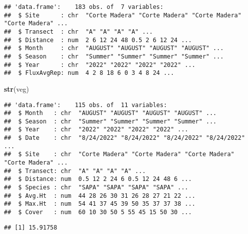 \documentclass[
]{article}
\newenvironment{Shaded}{\begin{snugshade}}{\end{snugshade}}
\newcommand{\AttributeTok}[1]{\textcolor[rgb]{0.13,0.29,0.53}{#1}}
\newcommand{\ConstantTok}[1]{\textcolor[rgb]{0.56,0.35,0.01}{#1}}
\newcommand{\FunctionTok}[1]{\textcolor[rgb]{0.13,0.29,0.53}{\textbf{#1}}}
\newcommand{\NormalTok}[1]{#1}
\newcommand{\OtherTok}[1]{\textcolor[rgb]{0.56,0.35,0.01}{#1}}
\newcommand{\SpecialCharTok}[1]{\textcolor[rgb]{0.81,0.36,0.00}{\textbf{#1}}}
\begin{document}
\begin{verbatim}
## 'data.frame':    183 obs. of  7 variables:
##  $ Site      : chr  "Corte Madera" "Corte Madera" "Corte Madera" "Corte Madera" ...
##  $ Transect  : chr  "A" "A" "A" "A" ...
##  $ Distance  : num  2 6 12 24 48 0.5 2 6 12 24 ...
##  $ Month     : chr  "AUGUST" "AUGUST" "AUGUST" "AUGUST" ...
##  $ Season    : chr  "Summer" "Summer" "Summer" "Summer" ...
##  $ Year      : chr  "2022" "2022" "2022" "2022" ...
##  $ FluxAvgRep: num  4 2 8 18 6 0 3 4 8 24 ...
\end{verbatim}

\begin{Shaded}
\begin{Highlighting}[]
\FunctionTok{str}\NormalTok{(veg)}
\end{Highlighting}
\end{Shaded}

\begin{verbatim}
## 'data.frame':    115 obs. of  11 variables:
##  $ Month   : chr  "AUGUST" "AUGUST" "AUGUST" "AUGUST" ...
##  $ Season  : chr  "Summer" "Summer" "Summer" "Summer" ...
##  $ Year    : chr  "2022" "2022" "2022" "2022" ...
##  $ Date    : chr  "8/24/2022" "8/24/2022" "8/24/2022" "8/24/2022" ...
##  $ Site    : chr  "Corte Madera" "Corte Madera" "Corte Madera" "Corte Madera" ...
##  $ Transect: chr  "A" "A" "A" "A" ...
##  $ Distance: num  0.5 12 2 24 6 0.5 12 24 48 6 ...
##  $ Species : chr  "SAPA" "SAPA" "SAPA" "SAPA" ...
##  $ Avg.Ht  : num  44 28 26 30 31 26 28 27 21 22 ...
##  $ Max.Ht  : num  54 41 37 45 39 50 35 37 37 38 ...
##  $ Cover   : num  60 10 30 50 5 55 45 15 50 30 ...
\end{verbatim}

\begin{Shaded}
\end{Shaded}

\begin{verbatim}
## [1] 15.91758
\end{verbatim}

\begin{Shaded}
\end{Shaded}
\end{document}
